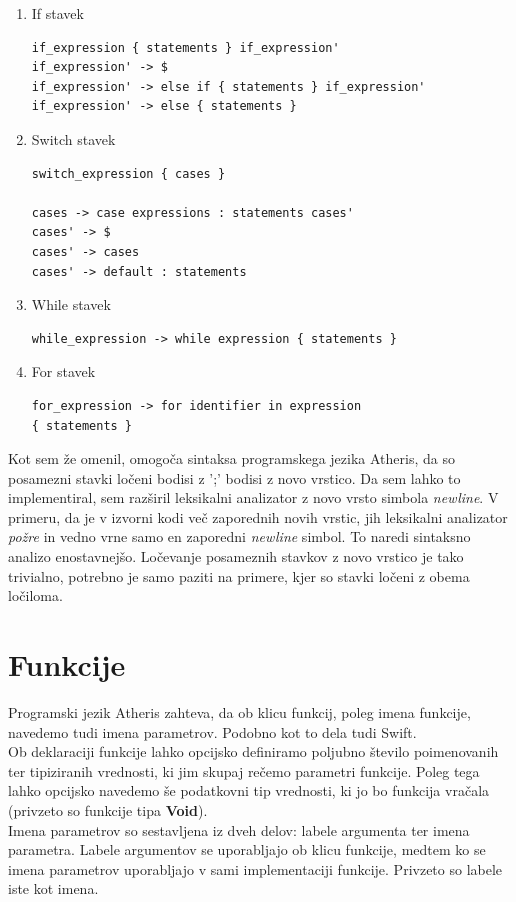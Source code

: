 \documentclass[a4paper, 12pt]{book}
\begin{document}
\begin{enumerate}
	\item If stavek
\begin{lstlisting}[]
if_expression { statements } if_expression'
if_expression' -> $
if_expression' -> else if { statements } if_expression'
if_expression' -> else { statements }
\end{lstlisting}
	\item Switch stavek
\begin{lstlisting}[]
switch_expression { cases }

cases -> case expressions : statements cases'
cases' -> $
cases' -> cases
cases' -> default : statements
\end{lstlisting}
	\item While stavek
\begin{lstlisting}[]
while_expression -> while expression { statements }
\end{lstlisting}
	\item For stavek
\begin{lstlisting}[]
for_expression -> for identifier in expression 
{ statements }
\end{lstlisting}
\end{enumerate} 

Kot sem že omenil, omogoča sintaksa programskega jezika Atheris, da so posamezni stavki ločeni bodisi z ';' bodisi z novo vrstico. Da sem lahko to implementiral, sem razširil leksikalni analizator z novo vrsto simbola \textit{newline}. V primeru, da je v izvorni kodi več zaporednih novih vrstic, jih leksikalni analizator \textit{požre} in vedno vrne samo en zaporedni \textit{newline} simbol. To naredi sintaksno analizo enostavnejšo. Ločevanje posameznih stavkov z novo vrstico je tako trivialno, potrebno je samo paziti na primere, kjer so stavki ločeni z obema ločiloma. 

\section{Funkcije}

Programski jezik Atheris zahteva, da ob klicu funkcij, poleg imena funkcije, navedemo tudi imena parametrov. Podobno kot to dela tudi Swift. \\
\indent Ob deklaraciji funkcije lahko opcijsko definiramo poljubno število poimenovanih ter tipiziranih vrednosti, ki jim skupaj rečemo parametri funkcije. Poleg tega lahko opcijsko navedemo še podatkovni tip vrednosti, ki jo bo funkcija vračala (privzeto so funkcije tipa \textbf{Void}). \\
\indent Imena parametrov so sestavljena iz dveh delov: labele argumenta ter imena parametra. Labele argumentov se uporabljajo ob klicu funkcije, medtem ko se imena parametrov uporabljajo v sami implementaciji funkcije. Privzeto so labele iste kot imena.
\end{document}
